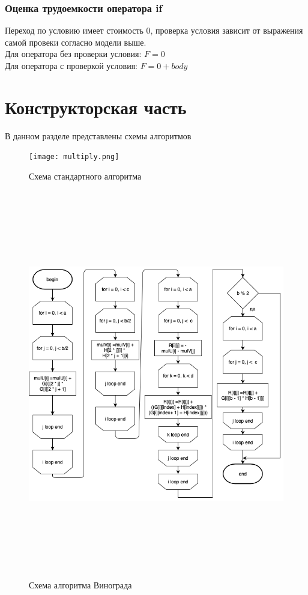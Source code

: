 \documentclass[12pt]{article}
\begin{document}
\subsubsection{Оценка трудоемкости оператора if}
Переход по условию имеет стоимость 0, проверка условия зависит от выражения самой провеки согласно модели выше.
\\Для оператора без проверки условия: $F =0$
\\Для оператора с проверкой условия: $F = 0 + body$
\newpage
\section{Конструкторская часть}
В данном разделе представлены схемы алгоритмов 

\begin{figure}[ht!]
	\centering
	\texttt{[image: multiply.png]}
	\caption{Схема стандартного алгоритма\label{overflow}}
\end{figure}
\begin{figure}[ht!]
	\centering
	\includegraphics[width=150mm, height=170mm]{wino-3.png}
	\caption{Схема алгоритма Винограда \label{overflow}}
\end{figure}
\end{document}
